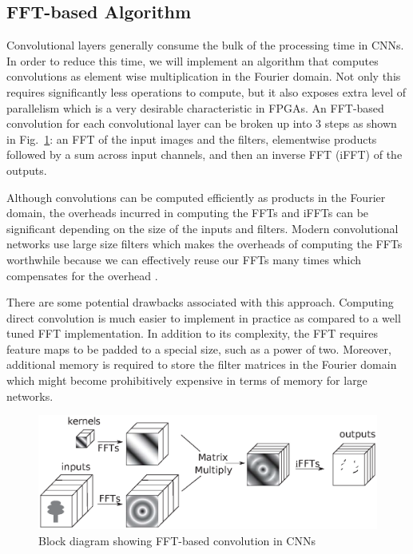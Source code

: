 \documentclass[conference,compsoc]{IEEEtran/IEEEtran}
\begin{document}
\subsection{FFT-based Algorithm}
Convolutional layers generally consume the bulk of the processing time in CNNs. In order to reduce this time, we will implement an algorithm that computes convolutions as element wise multiplication in the Fourier domain. Not only this requires significantly less operations to compute, but it also exposes extra level of parallelism which is a very desirable characteristic in FPGAs. An FFT-based convolution for each convolutional layer can be broken up into $3$ steps as shown in Fig.~\ref{CNN-FFT}: an FFT of the input images and the filters, elementwise products followed by a sum across input channels, and then an inverse FFT (iFFT) of the outputs.

Although convolutions can be computed efficiently as products in the Fourier domain, the overheads incurred in computing the FFTs and iFFTs can be significant depending on the size of the inputs and filters. Modern convolutional networks use large size filters which makes the overheads of computing the FFTs worthwhile because we can effectively reuse our FFTs many times which compensates for the overhead \cite{FFT1}.

There are some potential drawbacks associated with this approach. Computing direct convolution is much easier to implement in practice as compared to a well tuned FFT implementation. In addition to its complexity, the FFT requires feature maps to be padded to a special size, such as a power of two. Moreover, additional memory is required to store the filter matrices in the Fourier domain which might become prohibitively expensive in terms of memory for large networks.
\begin{figure}[!h]
\begin{center}
\centering
\includegraphics[width=1\columnwidth]{CNN-FFT.eps}
\caption{Block diagram showing FFT-based convolution in CNNs}
\label{CNN-FFT}
\end{center}
\end{figure}
\end{document}
